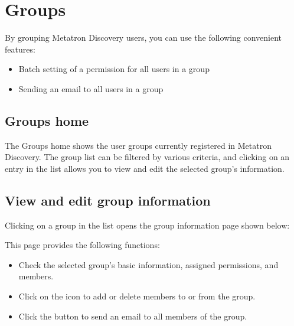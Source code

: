 \documentclass[letterpaper,10pt,english]{sphinxmanual}
\begin{document}
\section{Groups}
\label{\detokenize{discovery/part08/groups:user-groups}}\label{\detokenize{discovery/part08/groups:id1}}\label{\detokenize{discovery/part08/groups::doc}}
By grouping Metatron Discovery users, you can use the following convenient features:
\begin{itemize}
\item {} 
Batch setting of a permission for all users in a group

\item {} 
Sending an email to all users in a group

\end{itemize}


\subsection{Groups home}
\label{\detokenize{discovery/part08/groups:id2}}
The Groups home shows the user groups currently registered in Metatron Discovery. The group list can be filtered by various criteria, and clicking on an entry in the list allows you to view and edit the selected group’s information.
\begin{quote}

\begin{figure}[H]
\centering

\noindent{}
\end{figure}
\end{quote}


\subsection{View and edit group information}
\label{\detokenize{discovery/part08/groups:id3}}
Clicking on a group in the list opens the group information page shown below:
\begin{quote}

\begin{figure}[H]
\centering

\noindent{}
\end{figure}
\end{quote}

This page provides the following functions:
\begin{itemize}
\item {} 
Check the selected group’s basic information, assigned permissions, and members.

\item {} 
Click on the  icon to add or delete members to or from the group.

\item {} 
Click the  button to send an email to all members of the group.

\end{itemize}
\end{document}
